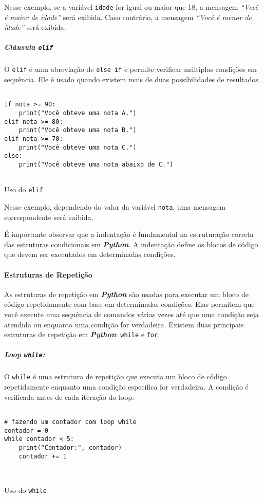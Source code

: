 \documentclass[a4paper, 12pt, onecolumn,singlespacing]{article}
\begin{document}
Nesse exemplo, se a variável \texttt{idade} for igual ou maior que 18, a mensagem \textit{``Você é maior de idade''} será exibida. Caso contrário, a mensagem \textit{``Você é menor de idade''} será exibida.

	\subparagraph{Cláusula \texttt{elif}}
	
	O \texttt{elif} é uma abreviação de \texttt{else if} e permite verificar múltiplas condições em sequência. Ele é usado quando existem mais de duas possibilidades de resultados.
	
\begin{listing}[!ht]
	\begin{verbatim}
		
if nota >= 90:
	print("Você obteve uma nota A.")
elif nota >= 80:
	print("Você obteve uma nota B.")
elif nota >= 70:
	print("Você obteve uma nota C.")
else:
	print("Você obteve uma nota abaixo de C.")
	
	\end{verbatim}
	\label{clausula_elif}
	\caption{Uso do \texttt{elif}}
\end{listing}
Nesse exemplo, dependendo do valor da variável \texttt{nota}, uma mensagem correspondente será exibida.

É importante observar que a indentação é fundamental na estruturação correta das estruturas condicionais em \textbf{\textit{Python}}. A indentação define os blocos de código que devem ser executados em determinadas condições.

	\paragraph{Estruturas de Repetição}
	As estruturas de repetição em \textbf{\textit{Python}} são usadas para executar um bloco de código repetidamente com base em determinadas condições. Elas permitem que você execute uma sequência de comandos várias vezes até que uma condição seja atendida ou enquanto uma condição for verdadeira. Existem duas principais estruturas de repetição em \textbf{\textit{Python}}: \texttt{while} e \texttt{for}.
	
	\subparagraph{Loop \texttt{while}:}O \texttt{while} é uma estrutura de repetição que executa um bloco de código repetidamente enquanto uma condição específica for verdadeira. A condição é verificada antes de cada iteração do loop.
	
\begin{listing}[!ht]
	\begin{verbatim}

# fazendo um contador com loop while	
contador = 0
while contador < 5:
	print("Contador:", contador)
	contador += 1

		
	\end{verbatim}
	\label{loop_while}
	\caption{Uso do \texttt{while}}
\end{listing}
\end{document}
